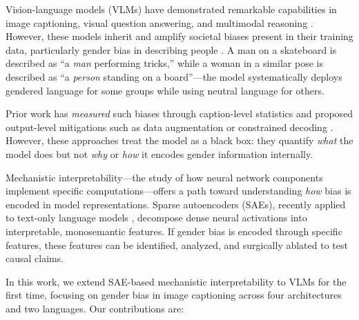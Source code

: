 \documentclass[11pt,a4paper]{article}
\newcommand{\sae}{SAE}
\newcommand{\saes}{SAEs}
\begin{document}
Vision-language models (VLMs) have demonstrated remarkable capabilities in image captioning, visual question answering, and multimodal reasoning \citep{liu2023visual,bai2023qwen,team2024paligemma}.
However, these models inherit and amplify societal biases present in their training data, particularly gender bias in describing people \citep{hendricks2018women,hirota2022quantifying}.
A man on a skateboard is described as ``a \emph{man} performing tricks,'' while a woman in a similar pose is described as ``a \emph{person} standing on a board''---the model systematically deploys gendered language for some groups while using neutral language for others.

Prior work has \emph{measured} such biases through caption-level statistics \citep{zhao2017men,hendricks2018women} and proposed output-level mitigations such as data augmentation or constrained decoding \citep{zhao2017men}.
However, these approaches treat the model as a black box: they quantify \emph{what} the model does but not \emph{why} or \emph{how} it encodes gender information internally.

Mechanistic interpretability---the study of how neural network components implement specific computations---offers a path toward understanding \emph{how} bias is encoded in model representations.
Sparse autoencoders (\saes{}), recently applied to text-only language models \citep{cunningham2023sparse,bricken2023monosemanticity,templeton2024scaling}, decompose dense neural activations into interpretable, monosemantic features.
If gender bias is encoded through specific features, these features can be identified, analyzed, and surgically ablated to test causal claims.

In this work, we extend \sae{}-based mechanistic interpretability to VLMs for the first time, focusing on gender bias in image captioning across four architectures and two languages.
Our contributions are:
\end{document}
